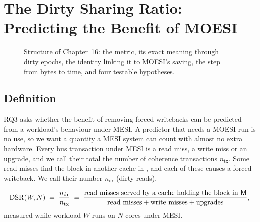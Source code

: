 \chapter{The Dirty Sharing Ratio: Predicting the Benefit of MOESI}
\label{ch:dsr}
%

\begin{figure}[htbp]
\centering
{}
\caption[]{Structure of Chapter~16: the metric, its exact
meaning through dirty epochs, the identity linking it to MOESI's saving, the step
from bytes to time, and four testable hypotheses.}
\label{fig:ch16-map}
\end{figure}

\section{Definition}
\label{sec:dsr-def}
%

RQ3 asks whether the benefit of removing forced writebacks can be predicted from a
workload's behaviour under MESI. A predictor that needs a MOESI run is no use, so
we want a quantity a MESI system can count with almost no extra hardware. Every bus
transaction under MESI is a read miss, a write miss or an upgrade, and we call
their total the number of coherence transactions $n_{\mathrm{tx}}$. Some read
misses find the block in another cache in \stM, and each of these causes a forced
writeback. We call their number $n_{\mathrm{dr}}$ (dirty reads).

\begin{keybox}
\[
  \mathrm{DSR}(W,N) \;=\; \frac{n_{\mathrm{dr}}}{n_{\mathrm{tx}}}
  \;=\; \frac{\text{read misses served by a cache holding the block in \textsf{M}}}
             {\text{read misses} + \text{write misses} + \text{upgrades}},
\]
measured while workload $W$ runs on $N$ cores under MESI.
\end{keybox}

